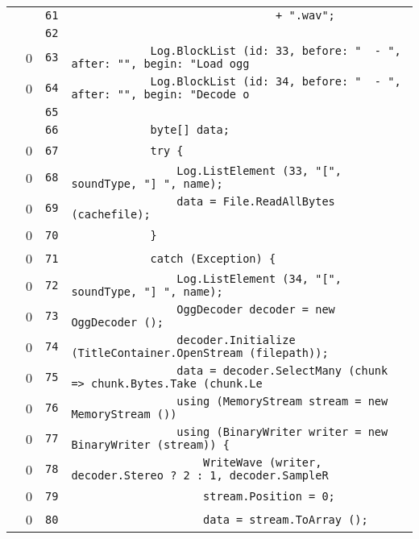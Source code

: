 \documentclass[a4paper,10pt]{article}
\begin{document}
\begin{longtable}[l]{lrrl}
\cellcolor{gray} &  & \verb~61~ & \verb~                               + ".wav";~\\
\cellcolor{gray} &  & \verb~62~ & \verb~~\\
\cellcolor{red} & 0 & \verb~63~ & \verb~            Log.BlockList (id: 33, before: "  - ", after: "", begin: "Load ogg~\\
\cellcolor{red} & 0 & \verb~64~ & \verb~            Log.BlockList (id: 34, before: "  - ", after: "", begin: "Decode o~\\
\cellcolor{gray} &  & \verb~65~ & \verb~~\\
\cellcolor{gray} &  & \verb~66~ & \verb~            byte[] data;~\\
\cellcolor{red} & 0 & \verb~67~ & \verb~            try {~\\
\cellcolor{red} & 0 & \verb~68~ & \verb~                Log.ListElement (33, "[", soundType, "] ", name);~\\
\cellcolor{red} & 0 & \verb~69~ & \verb~                data = File.ReadAllBytes (cachefile);~\\
\cellcolor{red} & 0 & \verb~70~ & \verb~            }~\\
\cellcolor{red} & 0 & \verb~71~ & \verb~            catch (Exception) {~\\
\cellcolor{red} & 0 & \verb~72~ & \verb~                Log.ListElement (34, "[", soundType, "] ", name);~\\
\cellcolor{red} & 0 & \verb~73~ & \verb~                OggDecoder decoder = new OggDecoder ();~\\
\cellcolor{red} & 0 & \verb~74~ & \verb~                decoder.Initialize (TitleContainer.OpenStream (filepath));~\\
\cellcolor{red} & 0 & \verb~75~ & \verb~                data = decoder.SelectMany (chunk => chunk.Bytes.Take (chunk.Le~\\
\cellcolor{red} & 0 & \verb~76~ & \verb~                using (MemoryStream stream = new MemoryStream ())~\\
\cellcolor{red} & 0 & \verb~77~ & \verb~                using (BinaryWriter writer = new BinaryWriter (stream)) {~\\
\cellcolor{red} & 0 & \verb~78~ & \verb~                    WriteWave (writer, decoder.Stereo ? 2 : 1, decoder.SampleR~\\
\cellcolor{red} & 0 & \verb~79~ & \verb~                    stream.Position = 0;~\\
\cellcolor{red} & 0 & \verb~80~ & \verb~                    data = stream.ToArray ();~\\

\end{longtable}
\end{document}
